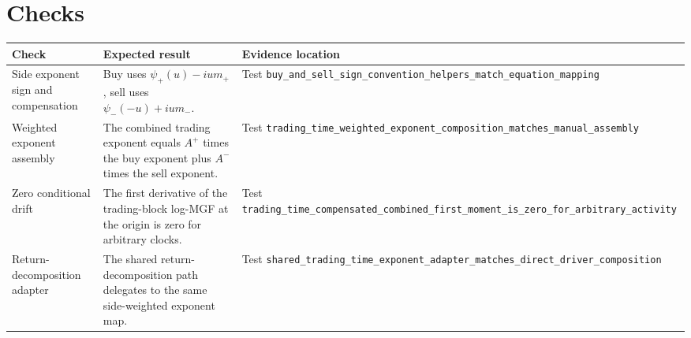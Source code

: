 \documentclass[11pt]{article}
\begin{document}
\section{Checks}

\begin{tabularx}{\textwidth}{XXX}
\toprule
Check & Expected result & Evidence location\\
\midrule
Side exponent sign and compensation
& Buy uses \(\psi_+(u)-ium_+\), sell uses \(\psi_-(-u)+ium_-\).
& Test \texttt{buy\_and\_sell\_sign\_convention\_helpers\_match\_equation\_mapping}\\
Weighted exponent assembly
& The combined trading exponent equals \(A^+\) times the buy exponent plus \(A^-\) times the sell exponent.
& Test \texttt{trading\_time\_weighted\_exponent\_composition\_matches\_manual\_assembly}\\
Zero conditional drift
& The first derivative of the trading-block log-MGF at the origin is zero for arbitrary clocks.
& Test \texttt{trading\_time\_compensated\_combined\_first\_moment\_is\_zero\_for\_arbitrary\_activity}\\
Return-decomposition adapter
& The shared return-decomposition path delegates to the same side-weighted exponent map.
& Test \texttt{shared\_trading\_time\_exponent\_adapter\_matches\_direct\_driver\_composition}\\
\bottomrule
\end{tabularx}
\end{document}
